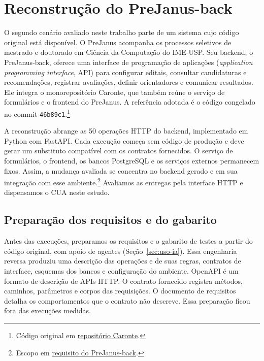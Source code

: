 \documentclass[a4paper,12pt,twoside,english,brazilian]{book}
\begin{document}
\chapter{Reconstrução do PreJanus-back}
\label{cap:experimento-prejanus}

O segundo cenário avaliado neste trabalho parte de um sistema cujo código
original está disponível. O PreJanus acompanha os processos seletivos de
mestrado e doutorado em Ciência da Computação do IME-USP. Seu backend,
o PreJanus-back, oferece uma interface de programação de aplicações (\emph{application
programming interface}, API) para configurar editais, consultar
candidaturas e recomendações, registrar avaliações, definir orientadores e
comunicar resultados. Ele integra o monorepositório Caronte, que também reúne
o serviço de formulários e o frontend do PreJanus. A referência adotada é o
código congelado no commit \texttt{46b89c1}.\footnote{Código original em
\href{https://gitlab.com/ccsl-usp/poscomp-ime/caronte/caronte-core/-/tree/46b89c1d5519aeae40c088ee94262e9b739a7d48/prejanus-back}{repositório Caronte}.}

A reconstrução abrange as 50 operações HTTP do backend, implementado em
Python com FastAPI. Cada execução começa sem código de produção e deve gerar
um substituto compatível com os contratos fornecidos. O serviço de formulários,
o frontend, os bancos PostgreSQL e os serviços externos permanecem fixos.
Assim, a mudança avaliada se concentra no backend gerado e em sua integração
com esse ambiente.\footnote{Escopo em
\href{https://github.com/Educg550/tcc/blob/ee6d001c1f618419c6184644d18aa97bb33bcf9a/demos/requisitos/05-prejanus-back-piloto-v3/requisito.md}{requisito do PreJanus-back}.}
Avaliamos as entregas pela interface HTTP e dispensamos o CUA neste estudo.

\section{Preparação dos requisitos e do gabarito}
\label{sec:prejanus-preliminares}

Antes das execuções, preparamos os requisitos e o gabarito de testes a
partir do código original, com apoio de agentes (Seção~\ref{sec:uso-ia}).
Essa engenharia reversa produziu uma descrição das operações e de suas
regras, contratos de interface, esquemas dos bancos e configuração do
ambiente. OpenAPI é um formato de descrição de APIs HTTP. O contrato
fornecido registra métodos, caminhos, parâmetros e corpos das requisições.
O documento de requisitos detalha os comportamentos que o contrato não
descreve. Essa preparação ficou fora das execuções medidas.
\end{document}
